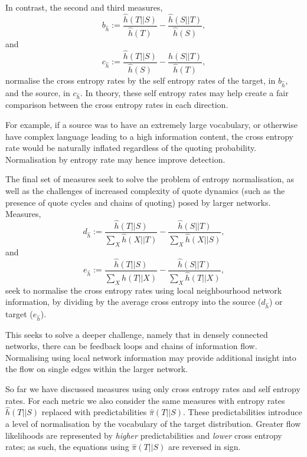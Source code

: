 In contrast, the second and third measures, 
\begin{equation}
b_{\hat{h}} := \frac{\hat{h}(T||S)}{\hat{h}(T)} - \frac{\hat{h}(S||T)}{\hat{h}(S)},
\end{equation}
and
\begin{equation}
c_{\hat{h}} := \frac{\hat{h}(T||S)}{\hat{h}(S)} - \frac{\hat{h}(S||T)}{\hat{h}(T)},
\end{equation}
normalise the cross entropy rates by the self entropy rates of the target, in $b_{\hat{h}}$, and the source, in $c_{\hat{h}}$. In theory, these self entropy rates may help create a fair comparison between the cross entropy rates in each direction.

For example, if a source was to have an extremely large vocabulary, or otherwise have complex language leading to a high information content, the cross entropy rate would be naturally inflated regardless of the quoting probability. Normalisation by entropy rate may hence improve detection.

The final set of measures seek to solve the problem of entropy normalisation, as well as the challenges of increased complexity of quote dynamics (such as the presence of quote cycles and chains of quoting) posed by larger networks. Measures, 
\begin{equation} d_{\hat{h}} := \frac{\hat{h}{(T||S)}}{\sum_X \hat{h}(X||T)} - \frac{\hat{h}(S||T)}{\sum_X \hat{h}(X||S)},\end{equation} 
and
\begin{equation} 
e_{\hat{h}} := \frac{\hat{h}(T||S)}{\sum_X \hat{h}(T||X)} - \frac{\hat{h}(S||T)}{\sum_X \hat{h}(T||X)},\end{equation}
seek to normalise the cross entropy rates using local neighbourhood network information, by dividing by the average cross entropy into the source ($d_{\hat{h}}$) or target ($e_{\hat{h}}$). 

This seeks to solve a deeper challenge, namely that in densely connected networks, there can be feedback loops and chains of information flow. Normalising using local network information may provide additional insight into the flow on single edges within the larger network.

So far we have discussed measures using only cross entropy rates and self entropy rates. For each metric we also consider the same measures with entropy rates $\hat{h}(T||S)$ replaced with predictabilities $\hat{\pi}(T||S)$. These predictabilities introduce a level of normalisation by the vocabulary of the target distribution. Greater flow likelihoods are represented by \emph{higher} predictabilities and \emph{lower} cross entropy rates; as such, the equations using $\hat{\pi}(T||S)$ are reversed in sign.

